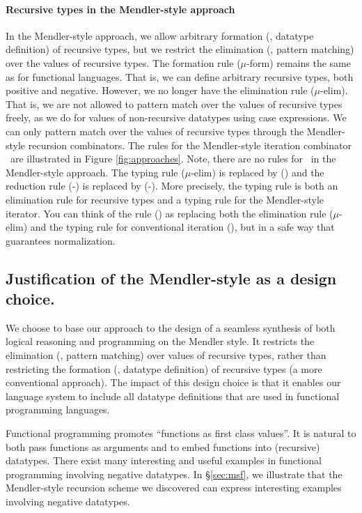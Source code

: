\paragraph{Recursive types in the Mendler-style approach}
In the Mendler-style approach, we allow arbitrary formation
(\ie, datatype definition) of recursive types, but we restrict
the elimination (\ie, pattern matching) over the values of recursive types. 
The formation rule {\small($\mu$-form)} remains the same as
for functional languages. That is, we can define arbitrary recursive types,
both positive and negative. However, we no longer have the elimination
rule {\small($\mu$-elim)}. That is, we are not allowed to pattern match over
the values of recursive types freely, as we do for values of non-recursive
datatypes using case expressions. We can only pattern match over
the values of recursive types through the Mendler-style recursion
combinators. The rules for the Mendler-style iteration combinator \MIt\
are illustrated in Figure \ref{fig:approaches}.
Note, there are no rules for \unIn\ in the Mendler-style approach.
The typing rule {\small($\mu$-elim)} is replaced by {\small(\MIt)} and
the reduction rule {\small(\unIn-\In)} is replaced by {\small(\MIt-\In)}.
More precisely, the typing rule {\small \MIt} is both an elimination rule
for recursive types and a typing rule for the Mendler-style iterator.
You can think of the rule {\small(\MIt)} as replacing both the elimination rule
{\small($\mu$-elim)} and the typing rule for conventional iteration
{\small(\It)}, but in a safe way that guarantees normalization.

\subsection{Justification of the Mendler-style as a design choice.}
\index{Mendler-style}
\label{sec:intro:concepts:mendler}
We choose to base our approach to the design of a seamless synthesis of both
logical reasoning and programming on the Mendler style. It restricts
the elimination (\ie, pattern matching) over values of recursive types,
rather than restricting the formation (\ie, datatype definition) of recursive types
(a more conventional approach). The impact of this design choice is that
it enables our language system to include all datatype definitions that
are used in functional programming languages.

Functional programming promotes ``functions as first class values''.
It is natural to both pass functions as arguments and to embed functions
into (recursive) datatypes. There exist many interesting and useful examples
in functional programming involving negative datatypes. In \S\ref{sec:msf},
we illustrate that the Mendler-style recursion scheme we discovered
can express interesting examples involving negative datatypes.

